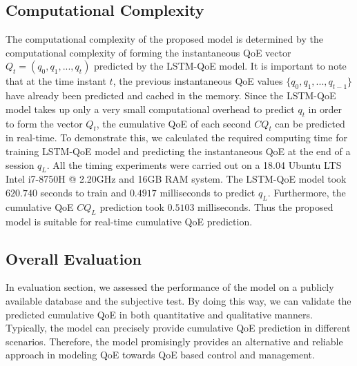 \subsection{Computational Complexity}
  The computational complexity of the proposed model is determined by the computational complexity of forming the instantaneous QoE vector $Q_{t} = (q_{0}, q_{1},...,q_{t})$ predicted by the LSTM-QoE model.
  It is important to note that at the time instant $t$, the previous instantaneous QoE values $\{ q_{0}, q_{1},...,q_{t-1} \}$ have already been predicted and cached in the memory. Since the LSTM-QoE model takes up only a very small computational overhead to predict $q_{t}$ in order to form the vector $Q_{t}$, the cumulative QoE of each second $CQ_{t}$ can be predicted in real-time.
  To demonstrate this, we calculated the required computing time for training LSTM-QoE model and predicting the instantaneous QoE at the end of a session $q_{L}$. All the timing experiments were carried out on a 18.04 Ubuntu LTS Intel i7-8750H @ 2.20GHz and 16GB RAM system. The LSTM-QoE model took $620.740$ seconds to train and $0.4917$ milliseconds to predict $q_{L}$. Furthermore, the cumulative QoE $CQ_{L}$ prediction took $0.5103$ milliseconds. Thus the proposed model is suitable for real-time cumulative QoE prediction.


\subsection{Overall Evaluation}
\label{section:OverallEvaluation}
  In evaluation section, we assessed the performance of the model on a publicly available database and the subjective test. By doing this way, we can validate the predicted cumulative QoE in both quantitative and qualitative manners. Typically, the model can precisely provide cumulative QoE prediction in different scenarios. Therefore, the model promisingly provides an alternative and reliable approach in modeling QoE towards QoE based control and management.
  
  